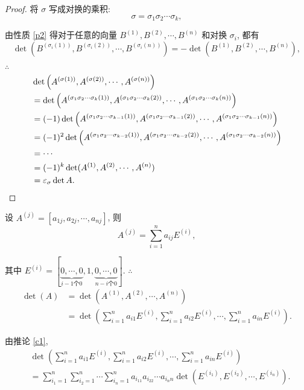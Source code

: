 \documentclass[color=black,device=normal,lang=cn,mode=geye]{elegantnote}
\begin{document}
\begin{proof}
    将 $\sigma$ 写成对换的乘积:
    \[\sigma=\sigma_1\sigma_2\cdots\sigma_k,\]

    由性质 \ref{p2} 得对于任意的向量 $B^{(1)},B^{(2)},\cdots,B^{(n)}$ 和对换 $\sigma_i$, 都有
    \[\det(B^{(\sigma_i(1))},B^{(\sigma_i(2))},\cdots,B^{(\sigma_i(n))})=-\det(B^{(1)},B^{(2)},\cdots,B^{(n)}),\]

    $\therefore$
    \begin{align*}
        & \det\left(A^{(\sigma(1))},A^{(\sigma(2))},\cdots,A^{(\sigma(n))}\right) \\
        & =\det\left(A^{(\sigma_1\sigma_2\cdots\sigma_k(1))},A^{(\sigma_1\sigma_2\cdots\sigma_k(2))},\cdots,A^{(\sigma_1\sigma_2\cdots\sigma_k(n))}\right) \\
        & =(-1)\det\left(A^{(\sigma_1\sigma_2\cdots\sigma_{k-1}(1))},A^{(\sigma_1\sigma_2\cdots\sigma_{k-1}(2))},\cdots,A^{(\sigma_1\sigma_2\cdots\sigma_{k-1}(n))}\right) \\
        & =(-1)^2\det\left(A^{(\sigma_1\sigma_2\cdots\sigma_{k-2}(1))},A^{(\sigma_1\sigma_2\cdots\sigma_{k-2}(2))},\cdots,A^{(\sigma_1\sigma_2\cdots\sigma_{k-2}(n))}\right) \\
        & =\cdots \\
        & =(-1)^k\det(A^{(1)},A^{(2)},\cdots,A^{(n)}) \\
        & =\varepsilon_\sigma\det A.\qedhere
    \end{align*}
\end{proof}

设 $A^{(j)}=[a_{1j},a_{2j},\cdots,a_{nj}]$, 则
\[A^{(j)}=\sum\limits_{i=1}^na_{ij}E^{(i)},\]

其中 $E^{(i)}=[\underbrace{0,\cdots,0}_{i-1\text{个}0},1,\underbrace{0,\cdots,0}_{n-i\text{个}0}]$. $\therefore$
\begin{align*}
    \det(A) & =\det(A^{(1)},A^{(2)},\cdots,A^{(n)}) \\
    & =\det\left(\sum\limits_{i=1}^na_{i1}E^{(i)},\sum\limits_{i=1}^na_{i2}E^{(i)},\cdots,\sum\limits_{i=1}^na_{in}E^{(i)}\right).
\end{align*}

由推论 \ref{c1},
\begin{align*}
    & \det\left(\sum\limits_{i=1}^na_{i1}E^{(i)},\sum\limits_{i=1}^na_{i2}E^{(i)},\cdots,\sum\limits_{i=1}^na_{in}E^{(i)}\right) \\
    & =\sum\limits_{i_1=1}^n\sum\limits_{i_2=1}^n\cdots\sum\limits_{i_n=1}^na_{i_11}a_{i_22}\cdots a_{i_nn}\det\left(E^{(i_1)},E^{(i_2)},\cdots,E^{(i_n)}\right). \\
\end{align*}
\end{document}
